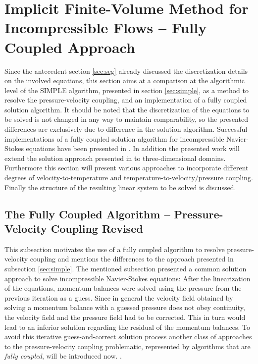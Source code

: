 \section{Implicit Finite-Volume Method for Incompressible Flows -- Fully Coupled Approach}
\label{sec:cpld}

Since the antecedent section \ref{sec:seg} already discussed the discretization details on the involved equations, this section aims at a comparison at the algorithmic level of the SIMPLE algorithm, presented in section \ref{sec:simple}, as a method to resolve the pressure-velocity coupling, and an implementation of a fully coupled solution algorithm. It should be noted that the discretization of the equations to be solved is not changed in any way to maintain comparability, so the presented differences are exclusively due to difference in the solution algorithm. Successful implementations of a fully coupled solution algorithm for incompressible Navier-Stokes equations have been presented in \cite{chen10,darwish09,falk13,vakilipour12}. In addition the presented work will extend the solution approach presented in \cite{falk13} to three-dimensional domains. Furthermore this section will present various approaches to incorporate different degrees of velocity-to-temperature and temperature-to-velocity/pressure coupling. Finally the structure of the resulting linear system to be solved is discussed.

\subsection{The Fully Coupled Algorithm -- Pressure-Velocity Coupling Revised}

This subsection motivates the use of a fully coupled algorithm to resolve pressure-velocity coupling and mentions the differences to the approach presented in subsection \ref{sec:simple}. The mentioned subsection presented a common solution approach to solve incompressible Navier-Stokes equations: After the linearization of the equations, momentum balances were solved using the pressure from the previous iteration as a guess. Since in general the velocity field obtained by solving a momentum balance with a guessed pressure does not obey continuity, the velocity field and the pressure field had to be corrected. This in turn would lead to an inferior solution regarding the residual of the momentum balances. To avoid this iterative guess-and-correct solution process another class of approaches to the pressure-velocity coupling problematic, represented by algorithms that are \emph{fully coupled}, will be introduced now. . 

